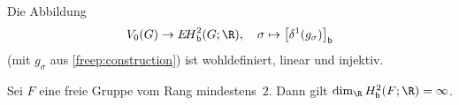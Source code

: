 \begin{thProposition}
    \label{freep:qmtocoho}%
    Die Abbildung
    \[ V_0(G) \to \EHb^2(G;\R), \quad
        \sigma \mapsto \bigl[\delta^1(g_\sigma)\bigr]_\bd
    \]
    (mit $g_\sigma$ aus \cref{freep:construction})
    ist wohldefiniert, linear und injektiv.
\end{thProposition}

\begin{thKorollar}
    \label{freep:cohofreegrp}%
    Sei $F$ eine freie Gruppe vom Rang mindestens~$2$. Dann gilt
    $\dim_{\R} \Hb^2(F;\R) = \infty$.
\end{thKorollar}
